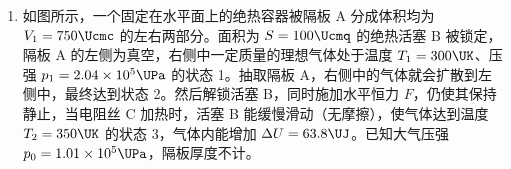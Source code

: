 \documentclass[\gkver]{gaokaozhenti}
\begin{document}
\begin{enumerate}
{（4）相邻两计数点间的时间间隔为 $t = 5T$
打计数点 5 时小车速度的表达式为
$v = \frac{x_{6} - x_{4}}{2t} = \frac{x_{6} - x_{4}}{10T}$
根据逐差法可得小车加速度的表达式是
$a = \frac{x_{6} - x_{3} - x_{3}}{(3t)^{2}} = \frac{x_{6} - 2x_{3}}{(15T)^{2}}$
故选 A。

Ⅱ．（1）把开关 S 接 1，电容器充电，电流从右向左流过微安表，微安表指针迅速向右偏转后示数逐渐减小到零；把开关 S 接 2，电容器放电，电流从左向右流过微安表，则微安表指针迅速向左偏转后示数逐渐减小。故选 C。

（2）由题意可知电压表应选用 $0\sim3\UV$ 量程，由图 2 可知此时分度值为 $0.1\UV$，需要估读到 $0.01\UV$，则读数为 $0.50\UV$。

当微安表示数稳定时，电容器中不再有电流通过，此时干电池、电阻箱、微安表和电压表构成回路，根据闭合电路欧姆定律有
$R + R_{\mathrm{v}} = \frac{E}{I} = \frac{1.5}{160\times10^{-6}}\UO = 9.375\UkO$
根据串联电路规律有
$\frac{R}{R_{\mathrm{v}}} = \frac{U_{R}}{U_{\mathrm{v}}} = \frac{1.5 - 0.5}{0.5} = 2$
联立可得 $R_{\mathrm{v}} \approx 3.1\UkO$

Ⅲ．（1）A．电路 A，定值电阻和热敏电阻并联，电压不变，故不能实现电路的控制，故 A 错误；

B．定值电阻和热敏电阻串联，温度越低，热敏电阻的阻值越大，定值电阻分得电压越小，无法实现 1、2 两端电压大于 $2\UV$，控制开关开启加热系统加热。故 B 错误；

C．定值电阻和热敏电阻串联，温度越低，热敏电阻的阻值越大，热敏电阻分得电压越大，可以实现 1、2 两端电压大于 $2\UV$，控制开关开启加热系统加热。故 C 正确。故选 C。

（2）由热敏电阻 $R_{t}$ 在不同温度时的阻值表可知，$20\UdC$ 的阻值为 $60\times100\UO = 6\UkO$
由题意可知
$U_{12} = \frac{R_{t}}{R_{t} + R}E = \frac{6\UkO}{6\UkO + R}\times3\UV = 2\UV$
解得 $R = 3\UkO$

（3）1、2 两端的电压小于 $2\UV$ 时，自动关闭加热系统（不考虑控制开关对电路的影响）。
}

\item
如图所示，一个固定在水平面上的绝热容器被隔板 A 分成体积均为 $V_{1} = 750\Ucmc$ 的左右两部分。面积为 $S = 100\Ucmq$ 的绝热活塞 B 被锁定，隔板 A 的左侧为真空，右侧中一定质量的理想气体处于温度 $T_{1} = 300\UK$、压强 $p_{1} = 2.04\times10^{5}\UPa$ 的状态 1。抽取隔板 A，右侧中的气体就会扩散到左侧中，最终达到状态 2。然后解锁活塞 B，同时施加水平恒力 $F$，仍使其保持静止，当电阻丝 C 加热时，活塞 B 能缓慢滑动（无摩擦），使气体达到温度 $T_{2} = 350\UK$ 的状态 3，气体内能增加 $\Delta U = 63.8\UJ$。已知大气压强 $p_{0} = 1.01\times10^{5}\UPa$，隔板厚度不计。


\end{enumerate}
\end{document}
